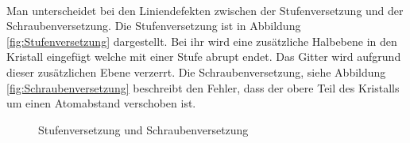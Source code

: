 \documentclass[11pt,a4paper]{article}
\numberwithin{equation}{section}
\numberwithin{figure}{section}
\begin{document}
\\
\begin{addmargin}[25pt]{0pt}    
Man unterscheidet bei den Liniendefekten zwischen der Stufenversetzung und der Schraubenversetzung. Die Stufenversetzung ist in Abbildung \ref{fig:Stufenversetzung} dargestellt. Bei ihr wird eine zusätzliche Halbebene in den Kristall eingefügt welche mit einer Stufe abrupt endet. Das Gitter wird aufgrund dieser zusätzlichen Ebene verzerrt. Die Schraubenversetzung, siehe Abbildung \ref{fig:Schraubenversetzung} beschreibt den Fehler, dass der obere Teil des Kristalls um einen Atomabstand verschoben ist. 

\begin{figure}[h]
  \centering
  \qquad
\caption{Stufenversetzung und Schraubenversetzung}
\label{fig:Liniendefekte}
\end{figure}

\end{addmargin}
\end{document}
